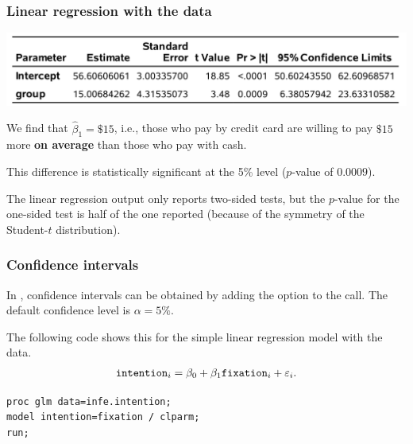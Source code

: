 \documentclass{beamer}
\begin{document}
\begin{frame}[fragile]
\frametitle{Linear regression with the  data}
\begin{center}
\includegraphics[width =0.9\linewidth]{img/c2/slides3-e14}
\end{center}
\bi
\item We find that $\widehat{\beta}_1=\$15$, i.e., those who pay by credit card are willing to pay $\$15$ more \textbf{on average} than those who pay with cash. 
\item This difference is statistically significant at the 5\% level ($p$-value of $0.0009$).
\item The linear regression output only reports two-sided tests, but the $p$-value for the one-sided test is half of the one reported (because of the symmetry of the Student-$t$ distribution).
\ei
\end{frame}
 
 \begin{frame}[fragile]
\frametitle{Confidence intervals}
\bi
\item 
In \SASlang, confidence intervals can be obtained by adding the option  to the  call. The default confidence level is $\alpha=5\%$.
\item The following code shows this for the simple linear regression model with the  data.
\ei
\begin{align*}
\texttt{intention}_i = \beta_0 + \beta_1 \texttt{fixation}_i + \varepsilon_i.
\end{align*}

\begin{tcolorbox}[colback=white, colframe=hecblue, title=\SASlang code to fit the regression model with the \code{glm} procedure]
\begin{verbatim}
proc glm data=infe.intention;
model intention=fixation / clparm;
run;
\end{verbatim}
\end{tcolorbox}


\end{frame}
\end{document}
